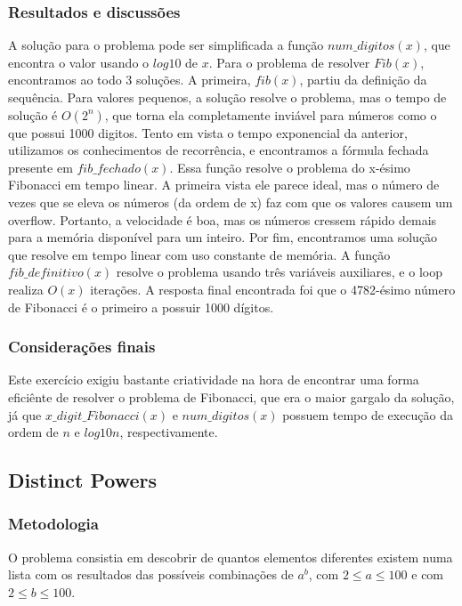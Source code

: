 \documentclass{article}
\begin{document}
        \subsubsection{Resultados e discussões}
        A solução para o problema pode ser simplificada a função $num\_digitos(x)$, que encontra o valor usando o $log10$ de $x$. Para o problema de resolver $Fib(x)$, encontramos ao todo 3 soluções.
        A primeira, $fib(x)$, partiu da definição da sequência. Para valores pequenos, a solução resolve o problema, mas o tempo de solução é $O(2^n)$, que torna ela completamente inviável para números como o que possui 1000 digitos.
        Tento em vista o tempo exponencial da anterior, utilizamos os conhecimentos de recorrência, e encontramos a fórmula fechada presente em $fib\_fechado(x)$. Essa função resolve o problema do x-ésimo Fibonacci em tempo linear. A primeira vista ele parece ideal, mas o número de vezes que se eleva os números (da ordem de x) faz com que os valores causem um overflow. Portanto, a velocidade é boa, mas os números cressem rápido demais para a memória disponível para um inteiro.
        Por fim, encontramos uma solução que resolve em tempo linear com uso constante de memória. A função $fib\_definitivo(x)$ resolve o problema usando três variáveis auxiliares, e o loop realiza $O(x)$ iterações.
        A resposta final encontrada foi que o 4782-ésimo número de Fibonacci é o primeiro a possuir 1000 dígitos.
        
        \subsubsection{Considerações finais}
        Este exercício exigiu bastante criatividade na hora de encontrar uma forma eficiênte de resolver o problema de Fibonacci, que era o maior gargalo da solução, já que $x\_digit\_Fibonacci(x)$ e $num\_digitos(x)$ possuem tempo de execução da ordem de $n$ e $log10 n$, respectivamente.
        
    \subsection{Distinct Powers}
        
        \subsubsection{Metodologia}
        O problema consistia em descobrir de quantos elementos diferentes existem numa lista com os resultados das possíveis combinações de $a^b$, com $2 \leq a \leq 100$ e com $2 \leq b \leq 100$.
        
\end{document}
